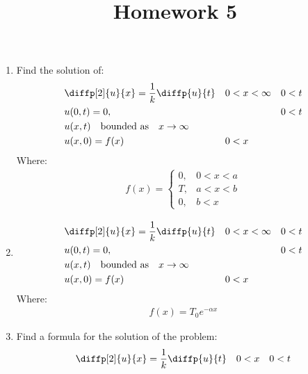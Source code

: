 \documentclass[12pt]{article}
\title{Homework 5}
\begin{document}
\maketitle

\begin{enumerate}
    \item Find the solution of:
          \begin{align*}
               & \diffp[2]{u}{x} = \frac{1}{k} \diffp{u}{t}              &  & 0<x<\infty &  & 0<t \\
               & u(0,t) = 0,                                             &  &            &  & 0<t \\
               & u(x,t) \quad \text{bounded as} \quad x\rightarrow\infty                          \\
               & u(x,0) = f(x)                                           &  & 0<x
          \end{align*}
          Where:
          \begin{gather*}
              f(x)=\begin{cases}
                  0, & 0<x<a \\
                  T, & a<x<b \\
                  0, & b<x
              \end{cases}
          \end{gather*} \label{Ex:1}
          
    \item \begin{align*}
               & \diffp[2]{u}{x} = \frac{1}{k} \diffp{u}{t}              &  & 0<x<\infty &  & 0<t \\
               & u(0,t) = 0,                                             &  &            &  & 0<t \\
               & u(x,t) \quad \text{bounded as} \quad x\rightarrow\infty                          \\
               & u(x,0) = f(x)                                           &  & 0<x
          \end{align*}
          Where:
          \begin{gather*}
              f(x) = T_{0}e^{-\alpha x}
          \end{gather*}
          
    \item Find a formula for the solution of the problem:
          \begin{align*}
               & \diffp[2]{u}{x} = \frac{1}{k} \diffp{u}{t} &  & 0<x &  & 0<t \\

\end{align*}
\end{enumerate}
\end{document}
